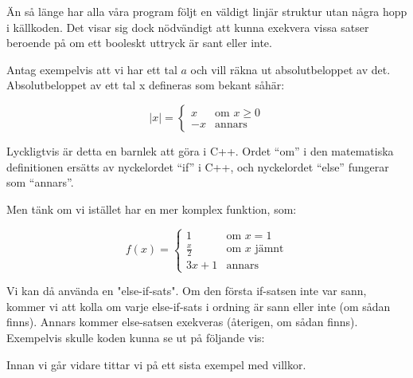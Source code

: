 Än så länge har alla våra program följt en väldigt linjär struktur utan några hopp i källkoden. Det visar sig dock nödvändigt att kunna exekvera vissa satser beroende på om ett booleskt uttryck är sant eller inte.

Antag exempelvis att vi har ett tal $a$ och vill räkna ut absolutbeloppet av det. Absolutbeloppet av ett tal x defineras som bekant såhär:

$$
|x| = 
\left\{
    \begin{array}{ll}
        x & \mbox{om } x \geq 0 \\
        -x & \mbox{annars}
    \end{array}
\right.
$$

Lyckligtvis är detta en barnlek att göra i C++. Ordet ``om'' i den matematiska definitionen ersätts av nyckelordet ``if'' i C++, och nyckelordet ``else'' fungerar som ``annars''.



Men tänk om vi istället har en mer komplex funktion, som:

$$
f(x) = 
\left\{
    \begin{array}{lll}
        1 & \mbox{om } x = 1\\
        \frac{x}{2} & \mbox{om } x \mbox{ jämnt}\\
        3x+1 & \mbox{annars}
    \end{array}
\right.
$$

Vi kan då använda en "else-if-sats". Om den första if-satsen inte var sann, kommer vi att kolla om varje else-if-sats i ordning är sann eller inte (om sådan finns). Annars kommer else-satsen exekveras (återigen, om sådan finns). Exempelvis skulle koden kunna se ut på följande vis:




Innan vi går vidare tittar vi på ett sista exempel med villkor.



